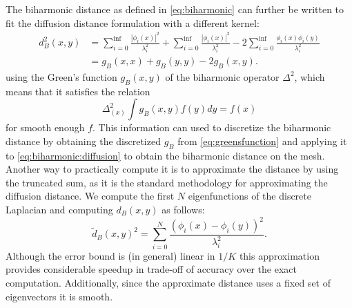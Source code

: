 The biharmonic distance as defined in \eqref{eq:biharmonic} can further be written to fit the diffusion distance formulation with a different kernel:
\begin{equation}
	\begin{split}
		d_B^2(x,y) & = \sum_{i=0}^{\inf} \frac{|\phi_i(x)|^2}{\lambda_i^2} + \sum_{i=0}^{\inf} \frac{|\phi_i(x)|^2}{\lambda_i^2} - 2 \sum_{i=0}^{\inf} \frac{\phi_i(x) \phi_i(y)}{\lambda_i^2}\\
		& = g_B(x,x) + g_B(y,y) - 2g_B(x,y).
	\end{split}
	\label{eq:biharmonic:diffusion}
\end{equation}
using the Green's function $g_B(x,y)$ of the biharmonic operator $\Delta^2$, which means that it satisfies the relation
\begin{equation}
	\Delta_{(x)}^2 \int g_B(x,y)f(y)dy = f(x)
	\label{eq:greensfunction}
\end{equation}
for smooth enough $f$.
This information can used to discretize the biharmonic distance by obtaining the discretized $g_B$ from \eqref{eq:greensfunction} and applying it to \eqref{eq:biharmonic:diffusion} to obtain the biharmonic distance on the mesh.
Another way to practically compute it is to approximate the distance by using the truncated sum, as it is the standard methodology for approximating the diffusion distance.
We compute the first $N$ eigenfunctions of the discrete Laplacian and computing $d_B(x,y)$ as follows:
\begin{equation}
	\tilde{d}_B(x,y)^2 = \sum_{i=0}^N \frac{(\phi_i(x) - \phi_i(y))^2}{\lambda_i^2}.
	\label{eq:biharmonic:practical}
\end{equation}
Although the error bound is (in general) linear in $1/K$ this approximation provides considerable speedup in trade-off of accuracy over the exact computation.
Additionally, since the approximate distance uses a fixed set of eigenvectors it is smooth.

